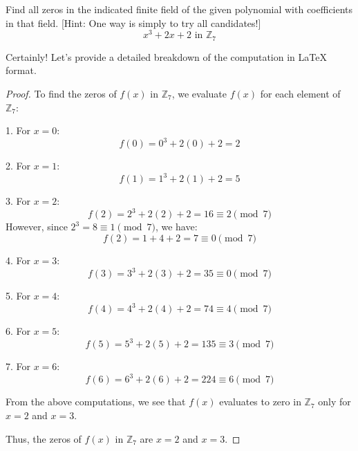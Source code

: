 \documentclass[12pt]{amsart}
\theoremstyle{definition}
\numberwithin{equation}{section}
\theoremstyle{plain}
\newcommand{\Z}{\mathbb{Z}}
\begin{document}
\begin{exercise}{13} Find all zeros in the indicated finite field of the given polynomial with coefficients in
    that field. [Hint: One way is simply to try all candidates!] \[x^3 + 2x + 2\text{ in }\Z_7\]

    Certainly! Let's provide a detailed breakdown of the computation in LaTeX format.

\begin{proof}
To find the zeros of \( f(x) \) in \( \Z_7 \), we evaluate \( f(x) \) for each element of \( \Z_7 \):

1. For \( x = 0 \):
\[ f(0) = 0^3 + 2(0) + 2 = 2 \]

2. For \( x = 1 \):
\[ f(1) = 1^3 + 2(1) + 2 = 5 \]

3. For \( x = 2 \):
\[ f(2) = 2^3 + 2(2) + 2 = 16 \equiv 2 \pmod{7} \]
However, since \( 2^3 = 8 \equiv 1 \pmod{7} \), we have:
\[ f(2) = 1 + 4 + 2 = 7 \equiv 0 \pmod{7} \]

4. For \( x = 3 \):
\[ f(3) = 3^3 + 2(3) + 2 = 35 \equiv 0 \pmod{7} \]

5. For \( x = 4 \):
\[ f(4) = 4^3 + 2(4) + 2 = 74 \equiv 4 \pmod{7} \]

6. For \( x = 5 \):
\[ f(5) = 5^3 + 2(5) + 2 = 135 \equiv 3 \pmod{7} \]

7. For \( x = 6 \):
\[ f(6) = 6^3 + 2(6) + 2 = 224 \equiv 6 \pmod{7} \]

From the above computations, we see that \( f(x) \) evaluates to zero in \( \Z_7 \) only for \( x = 2 \) and \( x = 3 \). 

Thus, the zeros of \( f(x) \) in \( \Z_7 \) are \( x = 2 \) and \( x = 3 \).
\end{proof}
\end{exercise}
\vspace*{20pt}
\end{document}
